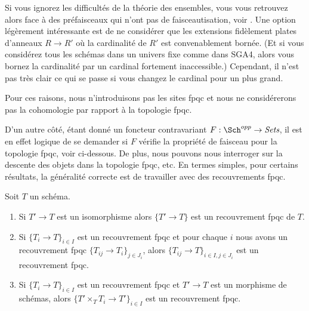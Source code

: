\medskip\noindent
Si vous ignorez les difficultés de la théorie des ensembles, vous vous retrouvez alors face à des préfaisceaux qui n'ont pas de faisceautisation, voir \cite[Théorème 5.5]{Waterhouse-fpqc-sheafification}. Une option légèrement intéressante est de ne considérer que les extensions fidèlement plates d'anneaux $R \to R'$ où la cardinalité de $R'$ est convenablement bornée. (Et si vous considérez tous les schémas dans un univers fixe comme dans SGA4, alors vous bornez la cardinalité par un cardinal fortement inaccessible.) Cependant, il n'est pas très clair ce qui se passe si vous changez le cardinal pour un plus grand.

\medskip\noindent
Pour ces raisons, nous n'introduisons pas les sites fpqc et nous ne considérerons pas la cohomologie par rapport à la topologie fpqc.

\medskip\noindent
D'un autre côté, étant donné un foncteur contravariant $F : \Sch^{opp} \to \textit{Sets}$, il est en effet logique de se demander si $F$ vérifie la propriété de faisceau pour la topologie fpqc, voir ci-dessous. De plus, nous pouvons nous interroger sur la descente des objets dans la topologie fpqc, etc. En termes simples, pour certains résultats, la généralité correcte est de travailler avec des recouvrements fpqc.

\begin{lemma}
\label{lemma-fpqc}
Soit $T$ un schéma.
\begin{enumerate}
\item Si $T' \to T$ est un isomorphisme alors $\{T' \to T\}$ est un recouvrement fpqc de $T$.
\item Si $\{T_i \to T\}_{i\in I}$ est un recouvrement fpqc et pour chaque $i$ nous avons un recouvrement fpqc $\{T_{ij} \to T_i\}_{j\in J_i}$, alors $\{T_{ij} \to T\}_{i \in I, j\in J_i}$ est un recouvrement fpqc.
\item Si $\{T_i \to T\}_{i\in I}$ est un recouvrement fpqc et $T' \to T$ est un morphisme de schémas, alors $\{T' \times_T T_i \to T'\}_{i\in I}$ est un recouvrement fpqc.
\end{enumerate}
\end{lemma}

